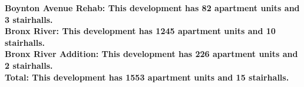 \bf{Boynton Avenue Rehab}: This development has 82 apartment units and 3 stairhalls.\\\bf{Bronx River}: This development has 1245 apartment units and 10 stairhalls.\\\bf{Bronx River Addition}: This development has 226 apartment units and 2 stairhalls.\\\bf{Total}: This development has 1553 apartment units and 15 stairhalls.\\